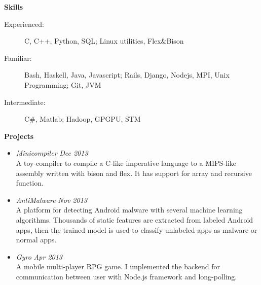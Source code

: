 \documentclass[letterpaper,11pt,adobefonts]{ctexart}
\newcommand{\resheading}[1]{{\large \colorbox{mygrey}{\begin{minipage}{\textwidth}{\textbf{#1 \vphantom{p\^{E}}}}\end{minipage}}}}
\begin{document}
\resheading{Skills}
    \begin{description}
    \item[Experienced:] { \footnotesize C, C++, Python, SQL; Linux utilities, Flex\&Bison}
    \item[Familiar:] { \footnotesize Bash, Haskell, Java, Javascript; Rails, Django, Nodejs, MPI, Unix Programming; Git, JVM}
    \item[Intermediate:] { \footnotesize C\#, Matlab; Hadoop, GPGPU, STM}
    \end{description} %
\resheading{Projects}
    \begin{itemize}
    \item 
    {\sl Minicompiler} \hfill \textit{Dec 2013}\\
    {\footnotesize
        {A toy-compiler to compile a C-like imperative language to a MIPS-like assembly written with bison and flex. It has support for array and recursive function.}
    }
    \item
    {\sl AntiMalware} \hfill \textit{Nov 2013}\\
    { \footnotesize 
        {A platform for detecting Android malware with several machine learning algorithms. Thousands of static features are extracted from labeled Android apps, then the trained model is used to classify unlabeled apps as malware or normal apps.}
    }
\item
    {\sl Gyro} \hfill \textit{Apr 2013}\\ 
    { \footnotesize A mobile multi-player RPG game. I implemented the backend for communication between user with Node.js framework and long-polling.}
\end{itemize}
\end{document}
